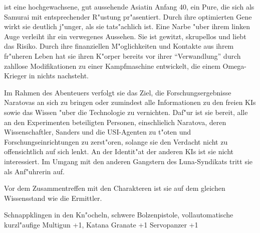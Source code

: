 \xl{} ist eine hochgewachsene, gut aussehende Asiatin Anfang 40, ein Pure, die sich als Samurai mit entsprechender R"ustung pr"asentiert. Durch ihre optimierten Gene wirkt sie deutlich j"unger, als sie tats"achlich ist. Eine Narbe "uber ihrem linken Auge verleiht ihr ein verwegenes Aussehen. Sie ist gewitzt, skrupellos und liebt das Risiko. Durch ihre finanziellen M"oglichkeiten und Kontakte aus ihrem fr"uheren Leben hat sie ihren K"orper bereits vor ihrer ``Verwandlung'' durch zahllose Modifikationen zu einer Kampfmaschine entwickelt, die einem Omega-Krieger in nichts nachsteht.

Im Rahmen des Abenteuers verfolgt sie das Ziel, die Forschungsergebnisse Naratovas an sich zu bringen oder zumindest alle Informationen zu den freien KIs sowie das Wissen "uber die Technologie zu vernichten. Daf"ur ist sie bereit, alle an den Experimenten beteiligten Personen, einschlie\3lich Naratova, deren Wissenschaftler, Sanders und die USI-Agenten zu t"oten und Forschungseinrichtungen zu zerst"oren, solange sie den Verdacht nicht zu offensichtlich auf sich lenkt. An der Identit"at der anderen KIs ist sie nicht interessiert. Im Umgang mit den anderen Gangstern des Luna-Syndikats tritt sie als Anf"uhrerin auf.

Vor dem Zusammentreffen mit den Charakteren ist sie auf dem gleichen Wissensstand wie die Ermittler.

\begin{nscsheet}[f]{\xls}
    \nscstats[ATT=3,AGG=3,DEX=2,COM=2,CON=2]
    \nscruler
    \begin{nscinventory}
        \nscitem[Waffen] Schnappklingen in den Kn"ocheln, schwere Bolzenpistole, vollautomatische kurzl"aufige Multigun +1, Katana
        \nscitem[Granaten] Granate +1
        \nscitem[R"ustung] Servopanzer +1
    \end{nscinventory}
\end{nscsheet}
